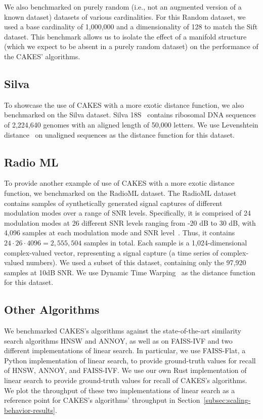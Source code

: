 We also benchmarked on purely random (i.e., not an augmented version of a known dataset) datasets of various cardinalities. 
For this Random dataset, we used a base cardinality of 1,000,000 and a dimensionality of 128 to match the Sift dataset.
This benchmark allows us to isolate the effect of a manifold structure (which we expect to be absent in a purely random dataset) on the performance of the CAKES' algorithms. 


\subsection{Silva}
\label{subsec:silva}
To showcase the use of CAKES with a more exotic distance function, we also benchmarked on the Silva dataset.
Silva 18S~\cite{10.1093/nar/gks1219} contains ribosomal DNA sequences of 2,224,640 genomes with an aligned length of 50,000 letters.
We use Levenshtein distance~\cite{levenshtein1966binary} on unaligned sequences as the distance function for this dataset.


\subsection{Radio ML}
\label{subsec:radioml}
To provide another example of use of CAKES with a more exotic distance function, we benchmarked on the RadioML dataset.
The RadioML dataset contains samples of synthetically generated signal captures of different modulation modes over a range of SNR levels.
Specifically, it is comprised of 24 modulation modes at 26 different SNR levels ranging from -20 dB to 30 dB, with 4,096 samples at each modulation mode and SNR level~\cite{oshea2018radioml}.
Thus, it contains $24 \cdot 26 \cdot 4096 = 2,555,504$ samples in total.
Each sample is a 1,024-dimensional complex-valued vector, representing a signal capture (a time series of complex-valued numbers).
We used a subset of this dataset, containing only the 97,920 samples at 10dB SNR.
We use Dynamic Time Warping~\cite{muller2007dynamic} as the distance function for this dataset.


\subsection{Other Algorithms}
We benchmarked CAKES's algorithms against the state-of-the-art similarity search algorithms HNSW and ANNOY, as well as on FAISS-IVF and two different implementations of linear search.
In particular, we use FAISS-Flat, a Python implementation of linear search, to provide ground-truth values for recall of HNSW, ANNOY, and FAISS-IVF.
We use our own Rust implementation of linear search to provide ground-truth values for recall of CAKES's algorithms.
We plot the throughput of these two implementations of linear search as a reference point for CAKES's algorithms' throughput in Section~\ref{subsec:scaling-behavior-results}.